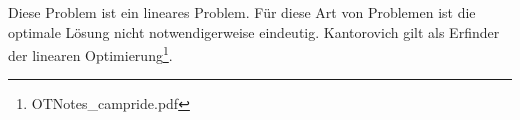 \documentclass[11pt,a4paper]{article}
\newtheorem{definition}[theorem]{Definition}
\newtheorem{example}[theorem]{Beispiel}
\numberwithin{equation}{section}
\begin{document}
	Diese Problem ist ein lineares Problem. Für diese Art von Problemen ist die optimale Lösung nicht notwendigerweise eindeutig. Kantorovich gilt als Erfinder der linearen Optimierung\footnote{OTNotes\_campride.pdf}.

\end{document}
